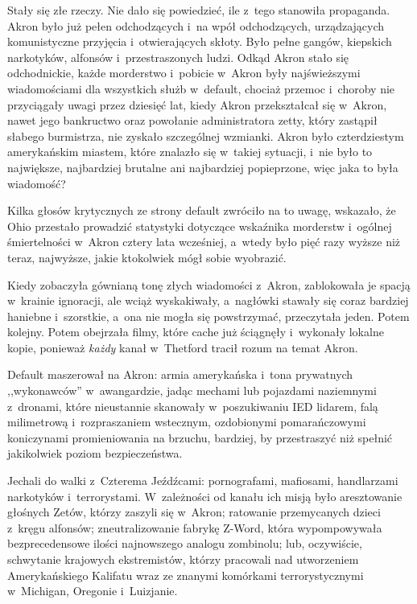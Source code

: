 \documentclass[oneside,polish,11pt,sfheadings]{mwbk}
\begin{document}
Stały się złe rzeczy. Nie dało się powiedzieć, ile z~tego stanowiła
propaganda. Akron było już pełen odchodzących i~na wpół odchodzących,
urządzających komunistyczne przyjęcia i~otwierających skłoty. Było pełne
gangów, kiepskich narkotyków, alfonsów i~przestraszonych ludzi. Odkąd
Akron stało się odchodnickie, każde morderstwo i~pobicie w~Akron były
najświeższymi wiadomościami dla wszystkich służb w~default, chociaż
przemoc i~choroby nie przyciągały uwagi przez dziesięć lat, kiedy Akron
przekształcał się w~Akron, nawet jego bankructwo oraz powołanie
administratora zetty, który zastąpił słabego burmistrza, nie zyskało
szczególnej wzmianki. Akron było czterdziestym amerykańskim miastem,
które znalazło się w~takiej sytuacji, i~nie było to największe,
najbardziej brutalne ani najbardziej popieprzone, więc jaka to była
wiadomość?

Kilka głosów krytycznych ze strony default zwróciło na to uwagę,
wskazało, że Ohio przestało prowadzić statystyki dotyczące wskaźnika
morderstw i~ogólnej śmiertelności w~Akron cztery lata wcześniej, a~wtedy
było pięć razy wyższe niż teraz, najwyższe, jakie ktokolwiek mógł sobie
wyobrazić.

Kiedy zobaczyła gównianą tonę złych wiadomości z~Akron, zablokowała je
spacją w~krainie ignoracji, ale wciąż wyskakiwały, a~nagłówki stawały
się coraz bardziej haniebne i~szorstkie, a~ona nie mogła się
powstrzymać, przeczytała jeden. Potem kolejny. Potem obejrzała filmy,
które cache już ściągnęły i~wykonały lokalne kopie, ponieważ \textit{każdy
}kanał w~Thetford tracił rozum na temat Akron.

Default maszerował na Akron: armia amerykańska i~tona prywatnych
,,wykonawców'' w~awangardzie, jadąc mechami lub pojazdami naziemnymi z~dronami, które nieustannie skanowały w~poszukiwaniu IED lidarem, falą
milimetrową i~rozpraszaniem wstecznym, ozdobionymi pomarańczowymi
koniczynami promieniowania na brzuchu, bardziej, by przestraszyć niż
spełnić jakikolwiek poziom bezpieczeństwa.

Jechali do walki z~Czterema Jeźdźcami: pornografami, mafiosami,
handlarzami narkotyków i~terrorystami. W~zależności od kanału ich misją
było aresztowanie głośnych Zetów, którzy zaszyli się w~Akron; ratowanie
przemycanych dzieci z~kręgu alfonsów; zneutralizowanie fabrykę Z-Word,
która wypompowywała bezprecedensowe ilości najnowszego analogu
zombinolu; lub, oczywiście, schwytanie krajowych ekstremistów, którzy
pracowali nad utworzeniem Amerykańskiego Kalifatu wraz ze znanymi
komórkami terrorystycznymi w~Michigan, Oregonie i~Luizjanie.
\end{document}
